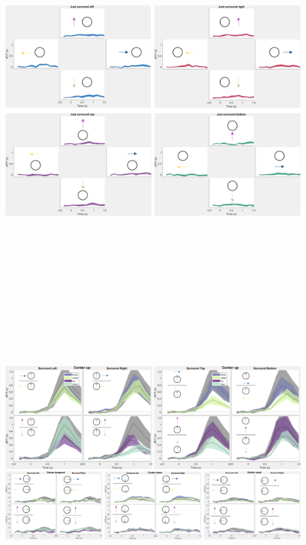 \begin{figure}[H] \centering \includegraphics[width=12.5cm,height=12.5cm,keepaspectratio]{Figures/7.Results/individualSM/roi 29 mf379 pos5/justsurrscol.png} 
\end{figure}

\begin{figure}[H] \centering \includegraphics[width=14cm,height=12.5cm,keepaspectratio]{Figures/7.Results/individualSM/roi 29 mf379 pos5/surroundresponses.png} 
\end{figure}

